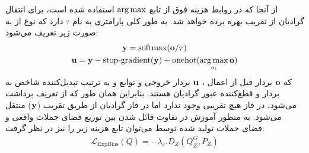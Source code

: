 از آنجا که در روابط هزینه فوق از تابع $\operatorname*{arg\,max}$ استفاده شده است، برای انتقال گرادیان از تقریب  بهره برده خواهد شد.   به طور کلی پارامتری به نام $\tau$ دارد که نوع  از به صورت زیر تعریف می‌شود:
\begin{gather}
	{\bf y} = \text{softmax}({\bf o}/\tau)
	\\
	{\bf u} = {\bf y} - \text{stop-gradient}({\bf y}) + \text{onehot}(\operatorname*{arg\,max}_{o_i} {\bf o})
\end{gather}
که ${\bf o}$ بردار قبل از اعمال 
،
${\bf u}$
بردار خروجی و توابع  و  به ترتیب تبدیل‌کننده شاخص به بردار
و قطع‌کننده عبور گرادیان هستند. بنابراین همان طور که از تعریف برداشت می‌شود، در فاز
هیچ تقریبی وجود ندارد اما در فاز
گرادیان از طریق تقریب 
(${\bf y}$)
منتقل می‌شود.
به منظور آموزش \encoder{} در تفاوت قائل شدن بین توزیع فضای جملات واقعی و فضای جملات تولید شده توسط \decoder{} می‌توان تابع هزینه زیر را نیز در نظر گرفت:
\begin{gather}
	\mathcal{L}_\text{ExpBias}(Q) = -\lambda_{e} . D_ Z(Q_Z^G, P_Z)
\end{gather}

